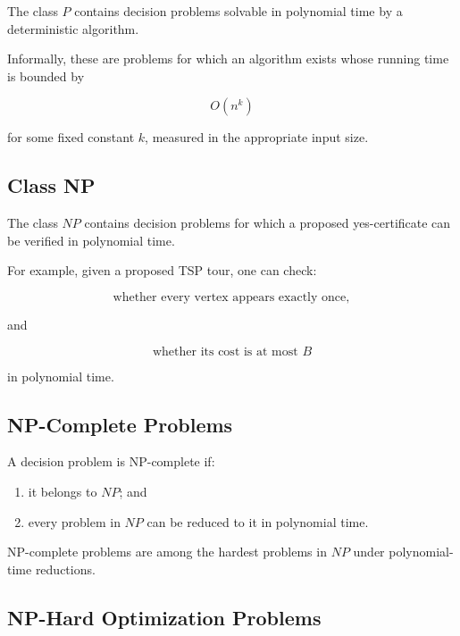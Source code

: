 The class \(P\) contains decision problems solvable in polynomial time by
a deterministic algorithm.

Informally, these are problems for which an algorithm exists whose running
time is bounded by

\[
\boxed{
O(n^k)
}
\]

for some fixed constant \(k\), measured in the appropriate input size.

\subsection{Class NP}
\label{subsec:class-np-combinatorial}

The class \(NP\) contains decision problems for which a proposed
yes-certificate can be verified in polynomial time.

For example, given a proposed TSP tour, one can check:

\[
\boxed{
\text{whether every vertex appears exactly once},
}
\]

and

\[
\boxed{
\text{whether its cost is at most }B
}
\]

in polynomial time.

\subsection{NP-Complete Problems}
\label{subsec:np-complete-combinatorial}

A decision problem is NP-complete if:

\begin{enumerate}
    \item it belongs to \(NP\); and
    \item every problem in \(NP\) can be reduced to it in polynomial time.
\end{enumerate}

NP-complete problems are among the hardest problems in \(NP\) under
polynomial-time reductions.

\subsection{NP-Hard Optimization Problems}
\label{subsec:np-hard-optimization}

